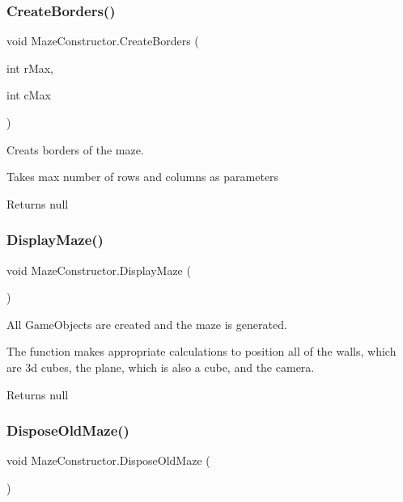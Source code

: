 \subsubsection{\texorpdfstring{CreateBorders()}{CreateBorders()}}
{\footnotesize\ttfamily void Maze\+Constructor.\+Create\+Borders (\begin{DoxyParamCaption}\item[{int}]{r\+Max,  }\item[{int}]{c\+Max }\end{DoxyParamCaption})\hspace{0.3cm}{\ttfamily [private]}}



Creats borders of the maze. 

Takes max number of rows and columns as parameters

\begin{DoxyReturn}{Returns}
null 
\end{DoxyReturn}
\mbox{\label{class_maze_constructor_a668f57a3dcd26933754452e599ac2dca}} 
\subsubsection{\texorpdfstring{DisplayMaze()}{DisplayMaze()}}
{\footnotesize\ttfamily void Maze\+Constructor.\+Display\+Maze (\begin{DoxyParamCaption}{ }\end{DoxyParamCaption})\hspace{0.3cm}{\ttfamily [private]}}



All Game\+Objects are created and the maze is generated. 

The function makes appropriate calculations to position all of the walls, which are 3d cubes, the plane, which is also a cube, and the camera.

\begin{DoxyReturn}{Returns}
null 
\end{DoxyReturn}
\mbox{\label{class_maze_constructor_abd20925c5331094b43c671c1624e1781}} 
\subsubsection{\texorpdfstring{DisposeOldMaze()}{DisposeOldMaze()}}
{\footnotesize\ttfamily void Maze\+Constructor.\+Dispose\+Old\+Maze (\begin{DoxyParamCaption}{ }\end{DoxyParamCaption})}




